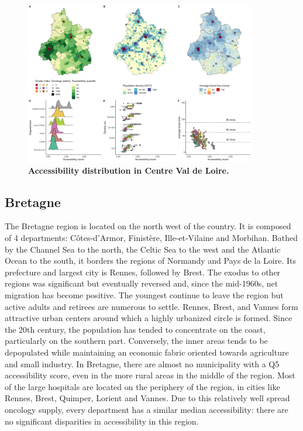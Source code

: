 \begin{figure}[H]
    \includegraphics[width=0.9\textwidth]{images/camion/region_accessibility/accessibility_Centre-Val-de-Loire.png}
    \centering
    \caption{
        \textbf{Accessibility distribution in Centre Val de Loire.}
    }
\end{figure}

\subsection*{Bretagne}

The Bretagne region is located on the north west of the country. It is composed
of 4 departments: Côtes-d'Armor, Finistère, Ille-et-Vilaine and Morbihan. Bathed
by the Channel Sea to the north, the Celtic Sea to the west and the Atlantic
Ocean to the south, it borders the regions of Normandy and Pays de la Loire. Its
prefecture and largest city is Rennes, followed by Brest. The exodus to other
regions was significant but eventually reversed and, since the mid-1960s, net
migration has become positive. The youngest continue to leave the region but
active adults and retirees are numerous to settle. Rennes, Brest, and Vannes
form attractive urban centers around which a highly urbanized circle is formed.
Since the 20th century, the population has tended to concentrate on the coast,
particularly on the southern part. Conversely, the inner areas tends to be
depopulated while maintaining an economic fabric oriented towards agriculture
and small industry. In Bretagne, there are almost no municipality with a Q5
accessibility score, even in the more rural areas in the middle of the region.
Most of the large hospitals are located on the periphery of the region, in
cities like Rennes, Brest, Quimper, Lorient and Vannes. Due to this relatively
well spread oncology supply, every department has a similar median
accessibility: there are no significant disparities in accessibility in this
region.

